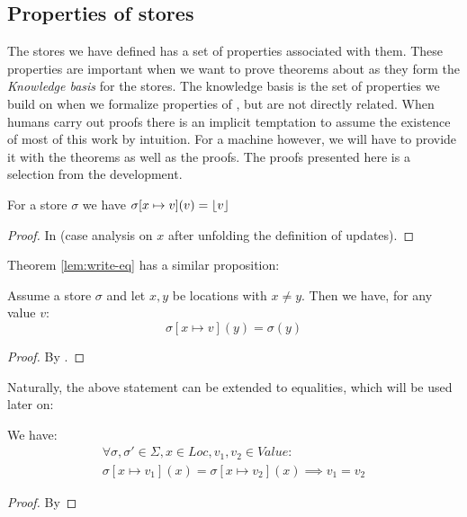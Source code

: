 \subsection{Properties of stores}

The stores we have defined has a set of properties associated with
them. These properties are important when we want to prove theorems
about \janusz{} as they form the \emph{Knowledge basis} for the
stores. The knowledge basis is the set of properties we build on when
we formalize properties of \janusz{}, but are not directly
related. When humans carry out proofs there is an implicit temptation
to assume the existence of most of this work by intuition. For a
machine however, we will have to provide it with the theorems as well
as the proofs. The proofs presented here is a selection from the
development.

\begin{lem}
  \label{lem:write-eq}
  For a store $\sigma$ we have $\sigma[x \mapsto v](v) = \lfloor v \rfloor$
\end{lem}
\begin{proof}
  In \coq{} (case analysis on $x$ after unfolding the definition of updates).
\end{proof}
Theorem \ref{lem:write-eq} has a similar proposition:
\begin{lem}
  Assume a store $\sigma$ and let $x, y$ be locations with $x \neq
  y$. Then we have, for any value $v$:
  \begin{equation*}
    \sigma[x \mapsto v](y) = \sigma(y)
  \end{equation*}
\end{lem}
\begin{proof}
  By \coq{}.
\end{proof}

Naturally, the above statement can be extended to equalities, which
will be used later on:
\begin{lem}
\label{lem:write-eq2}
  We have:
  \begin{multline*}
    \forall \sigma, \sigma' \in \Sigma, x \in Loc, v_1, v_2 \in Value
    \colon \\
    \sigma[x \mapsto v_1](x) = \sigma[x \mapsto v_2](x) \implies v_1 = v_2
  \end{multline*}
\end{lem}
\begin{proof}
  By \coq{}
\end{proof}

